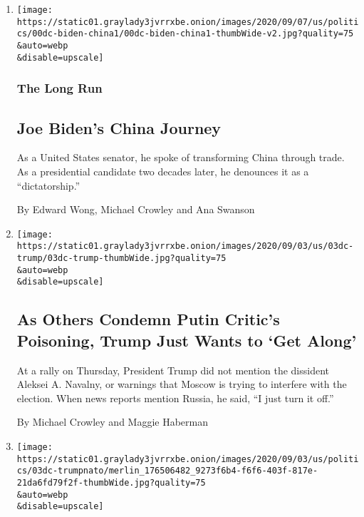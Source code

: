 \begin{enumerate}
\def\labelenumi{\arabic{enumi}.}
\item
  \href{/2020/09/06/us/politics/biden-china.html}{}

  \texttt{[image: https://static01.graylady3jvrrxbe.onion/images/2020/09/07/us/politics/00dc-biden-china1/00dc-biden-china1-thumbWide-v2.jpg?quality=75\\\&auto=webp\\\&disable=upscale]}

  \hypertarget{the-long-run}{%
  \subsubsection{The Long Run}\label{the-long-run}}

  \hypertarget{joe-bidens-china-journey}{%
  \subsection{Joe Biden's China
  Journey}\label{joe-bidens-china-journey}}

  As a United States senator, he spoke of transforming China through
  trade. As a presidential candidate two decades later, he denounces it
  as a ``dictatorship.''

  By Edward Wong, Michael Crowley and Ana Swanson
\item
  \href{/2020/09/03/us/politics/trump-russia-navalny-poisoning.html}{}

  \texttt{[image: https://static01.graylady3jvrrxbe.onion/images/2020/09/03/us/03dc-trump/03dc-trump-thumbWide.jpg?quality=75\\\&auto=webp\\\&disable=upscale]}

  \hypertarget{as-others-condemn-putin-critics-poisoning-trump-just-wants-to-get-along}{%
  \subsection{As Others Condemn Putin Critic's Poisoning, Trump Just
  Wants to `Get
  Along'}\label{as-others-condemn-putin-critics-poisoning-trump-just-wants-to-get-along}}

  At a rally on Thursday, President Trump did not mention the dissident
  Aleksei A. Navalny, or warnings that Moscow is trying to interfere
  with the election. When news reports mention Russia, he said, ``I just
  turn it off.''

  By Michael Crowley and Maggie Haberman
\item
  \href{/2020/09/03/us/politics/trump-nato-withdraw.html}{}

  \texttt{[image: https://static01.graylady3jvrrxbe.onion/images/2020/09/03/us/politics/03dc-trumpnato/merlin\_176506482\_9273f6b4-f6f6-403f-817e-21da6fd79f2f-thumbWide.jpg?quality=75\\\&auto=webp\\\&disable=upscale]}


\end{enumerate}

